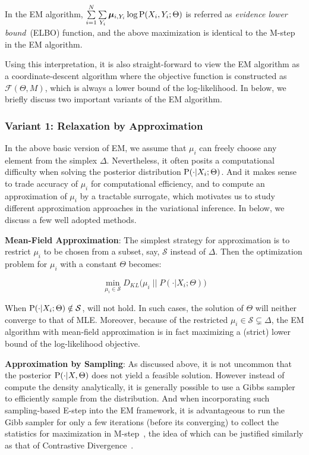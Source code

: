 In the EM algorithm, $\sum\limits_{i=1}^N \sum\limits_{Y_i} \vmu_{i, Y_i} \log
\P(X_i, Y_i ;\Theta)$ is referred as \emph{evidence lower bound}~(ELBO)
function, and the above maximization is identical to the M-step in the EM
algorithm.

Using this interpretation, it is also straight-forward to view the EM algorithm
as a coordinate-descent algorithm where the objective function is constructed as
$\mathcal{F}(\Theta, M)$, which is always a lower bound of the log-likelihood.
In below, we briefly discuss two important variants of the EM algorithm.

\subsubsection{Variant 1: Relaxation by Approximation}

In the above basic version of EM, we assume that $\mu_i$ can freely choose any
element from the simplex $\Delta$. Nevertheless, it often posits a computational
difficulty when solving the posterior distribution $\P(\cdot | X_i; \Theta)$.
And it makes sense to trade accuracy of $\mu_i$ for computational efficiency,
and to compute an approximation of $\mu_i$ by a tractable surrogate, which
motivates us to study different approximation approaches in the variational
inference. In below, we discuss a few well adopted methods.

\noindent \textbf{Mean-Field Approximation}: The simplest strategy for
approximation is to restrict $\mu_i$ to be chosen from a subset, say,
$\mathcal{S}$ instead of $\Delta$. Then the optimization problem for $\mu_i$
with a constant $\Theta$ becomes:

\begin{equation}
\min\limits_{\mu_i \in \mathcal{S}} D_{KL}
\big(\mu_i \; ||\; P(\cdot | X_i; \Theta)\big)\label{eq::em-alg-e-appro}
\end{equation}

When $\P(\cdot | X_i; \Theta) \notin \mathcal{S}$,  will
not hold. In such cases, the solution of $\Theta$ will neither converge to that
of MLE.  Moreover, because of the restricted $\mu_i \in \mathcal{S} \subsetneq
\Delta$, the EM algorithm with mean-field approximation is in fact maximizing a
(strict) lower bound of the log-likelihood objective.

\noindent \textbf{Approximation by Sampling}: As discussed above, it is not
uncommon that the posterior $\P(\cdot | X, \Theta)$ does not yield a feasible
solution. However instead of compute the density analytically, it is generally
possible to use a Gibbs sampler to efficiently sample from the distribution. And
when incorporating such sampling-based E-step into the EM framework, it is
advantageous to run the Gibb sampler for only a few iterations (before its
converging) to collect the statistics for maximization in
M-step~\cite{wang2016tpp}, the idea of which can be justified similarly as that
of Contrastive Divergence~\cite{carreira2005contrastive}.

